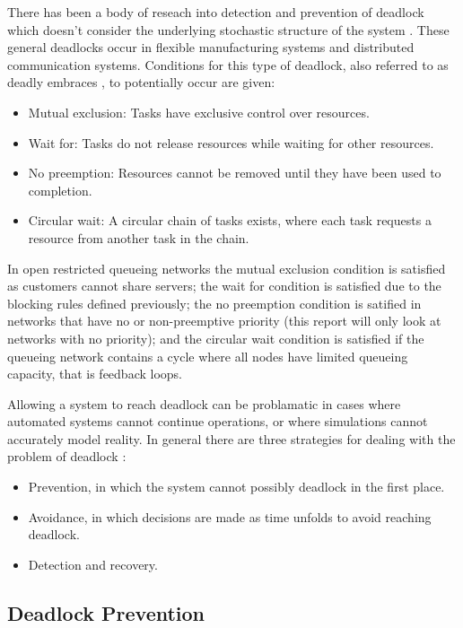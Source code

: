 \documentclass{article}
\begin{document}
There has been a body of reseach into detection and prevention of deadlock which doesn't consider the underlying stochastic structure of the system \cite{coffmanelphick71}.
These general deadlocks occur in flexible manufacturing systems and distributed communication systems.
Conditions for this type of deadlock, also referred to as deadly embraces \cite{coffmanelphick71}, to potentially occur are given:
\begin{itemize}
  \item Mutual exclusion: Tasks have exclusive control over resources.
  \item Wait for: Tasks do not release resources while waiting for other resources.
  \item No preemption: Resources cannot be removed until they have been used to completion.
  \item Circular wait: A circular chain of tasks exists, where each task requests a resource from another task in the chain.
\end{itemize}

In open restricted queueing networks the mutual exclusion condition is satisfied as customers cannot share servers; the wait for condition is satisfied due to the blocking rules defined previously; the no preemption condition is satified in networks that have no or non-preemptive priority (this report will only look at networks with no priority); and the circular wait condition is satisfied if the queueing network contains a cycle where all nodes have limited queueing capacity, that is feedback loops.

Allowing a system to reach deadlock can be problamatic in cases where automated systems cannot continue operations, or where simulations cannot accurately model reality.
In general there are three strategies for dealing with the problem of deadlock \cite{kawadkaretal14, elmagarmid86}:

\begin{itemize}
  \item Prevention, in which the system cannot possibly deadlock in the first place.
  \item Avoidance, in which decisions are made as time unfolds to avoid reaching deadlock.
  \item Detection and recovery.
\end{itemize}

\subsection{Deadlock Prevention}
\end{document}
